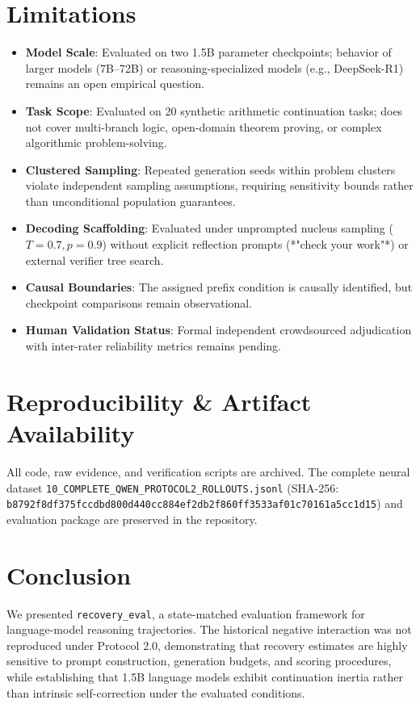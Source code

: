 \documentclass[10pt,conference]{IEEEtran}
\begin{document}
\section{Limitations}
\begin{itemize}
    \item \textbf{Model Scale}: Evaluated on two 1.5B parameter checkpoints; behavior of larger models (7B--72B) or reasoning-specialized models (e.g., DeepSeek-R1) remains an open empirical question.
    \item \textbf{Task Scope}: Evaluated on 20 synthetic arithmetic continuation tasks; does not cover multi-branch logic, open-domain theorem proving, or complex algorithmic problem-solving.
    \item \textbf{Clustered Sampling}: Repeated generation seeds within problem clusters violate independent sampling assumptions, requiring sensitivity bounds rather than unconditional population guarantees.
    \item \textbf{Decoding Scaffolding}: Evaluated under unprompted nucleus sampling ($T=0.7, p=0.9$) without explicit reflection prompts (*"check your work"*) or external verifier tree search.
    \item \textbf{Causal Boundaries}: The assigned prefix condition is causally identified, but checkpoint comparisons remain observational.
    \item \textbf{Human Validation Status}: Formal independent crowdsourced adjudication with inter-rater reliability metrics remains pending.
\end{itemize}

\section{Reproducibility \& Artifact Availability}
All code, raw evidence, and verification scripts are archived. The complete neural dataset \texttt{10\_COMPLETE\_QWEN\_PROTOCOL2\_ROLLOUTS.jsonl} (SHA-256: \texttt{b8792f8df375fccdbd800d440cc884ef\allowbreak 2db2f860ff3533af01c70161a5cc1d15}) and evaluation package are preserved in the repository.

\section{Conclusion}
We presented \texttt{recovery\_eval}, a state-matched evaluation framework for language-model reasoning trajectories. The historical negative interaction was not reproduced under Protocol 2.0, demonstrating that recovery estimates are highly sensitive to prompt construction, generation budgets, and scoring procedures, while establishing that 1.5B language models exhibit continuation inertia rather than intrinsic self-correction under the evaluated conditions.



\end{document}

